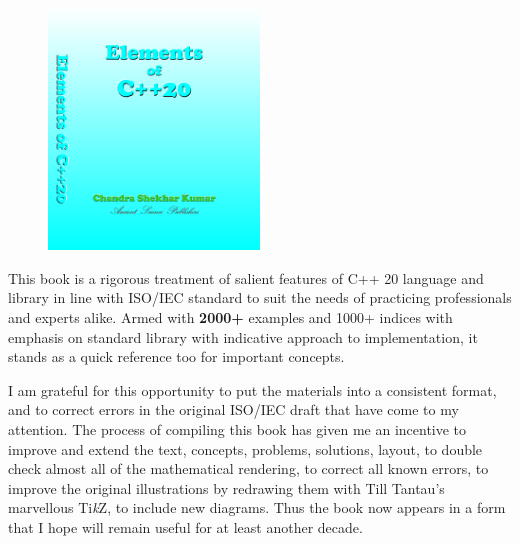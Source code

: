 
\begin{figure}
  \begin{center}
    \includegraphics[width=0.5\textwidth]{cpp20/cover}
  \end{center}
\end{figure}

\hspace{5mm}This book is a rigorous treatment of salient features of C++ 20 language and library in line with ISO/IEC standard to suit the needs of practicing professionals and experts alike. Armed with \textbf{2000+} examples and 1000+ indices with emphasis on standard library with indicative approach to implementation, it stands as a quick reference too for important concepts. 

\vspace{2mm}

I am grateful for this opportunity to put the materials into a consistent format, and to correct errors in the original ISO/IEC draft that have come to my attention. The process of compiling this book has given me an incentive to improve and extend the text, concepts, problems, solutions, layout, to double check almost all of the mathematical rendering, to correct all known errors, to improve the original illustrations by redrawing them with Till Tantau's marvellous \textup{Ti\textit{k}Z}, to include new diagrams. Thus the book now appears in a form that I hope will remain useful for at least another decade.


